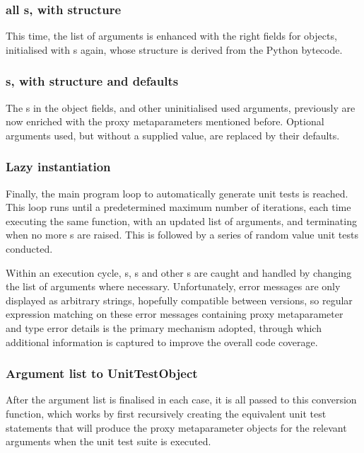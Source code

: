\documentclass{icldt}
\numberwithin{equation}{section}       %
\begin{document}
{{\subsubsection{all s, with structure}
This time, the list of arguments is enhanced with the right fields for objects, initialised with s again, whose structure is derived from the Python bytecode.

\subsubsection{s, with structure and defaults}
The s in the object fields, and other uninitialised used arguments, previously are now enriched with the proxy metaparameters mentioned before. Optional arguments used, but without a supplied value, are replaced by their defaults.

\subsubsection{Lazy instantiation}
Finally, the main program loop to automatically generate unit tests is reached. This loop runs until a predetermined maximum number of iterations, each time executing the same function, with an updated list of arguments, and terminating when no more s are raised. This is followed by a series of random value unit tests conducted.

Within an execution cycle, s, s and other s are caught and handled by changing the list of arguments where necessary. Unfortunately, error messages are only displayed as arbitrary strings, hopefully compatible between versions, so regular expression matching on these error messages containing proxy metaparameter and type error details is the primary mechanism adopted, through which additional information is captured to improve the overall code coverage.

\subsubsection{Argument list to \textsf{UnitTestObject}}
After the argument list is finalised in each case, it is all passed to this conversion function, which works by first recursively creating the equivalent unit test statements that will produce the proxy metaparameter objects for the relevant arguments when the unit test suite is executed.

}}
\end{document}
